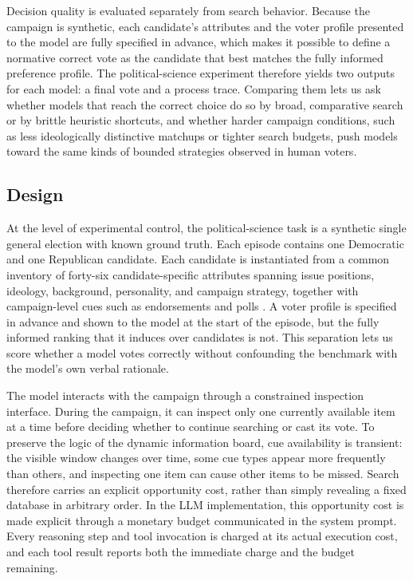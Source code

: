 Decision quality is evaluated separately from search behavior. Because the campaign is
synthetic, each candidate's attributes and the voter profile presented to the model are
fully specified in advance, which makes it possible to define a normative correct vote as
the candidate that best matches the fully informed preference profile. The
political-science experiment therefore yields two outputs for each model: a final vote and
a process trace. Comparing them lets us ask whether models that reach the correct choice
do so by broad, comparative search or by brittle heuristic shortcuts, and whether harder
campaign conditions, such as less ideologically distinctive matchups or tighter search
budgets, push models toward the same kinds of bounded strategies observed in human voters.

\subsection{Design}

At the level of experimental control, the political-science task is a synthetic
single general election with known ground truth. Each episode contains one Democratic and
one Republican candidate. Each candidate is instantiated from a common inventory of
forty-six candidate-specific attributes spanning issue positions, ideology, background,
personality, and campaign strategy, together with campaign-level cues such as
endorsements and polls \citep{lau2006voters}.
A voter profile is specified in advance and shown to the model at the start of the
episode, but the fully informed ranking that it induces over candidates is not. This
separation lets us score whether a model votes correctly without
confounding the benchmark with the model's own verbal rationale.

The model interacts with the campaign through a constrained inspection interface. During
the campaign, it can inspect only one currently available item at a time before deciding
whether to continue searching or cast its vote. To preserve the logic of the dynamic
information board, cue availability is transient: the visible window changes over time, some cue
types appear more frequently than others, and inspecting one item can cause other items
to be missed. Search therefore carries an explicit opportunity cost, rather than simply
revealing a fixed database in arbitrary order. In the LLM implementation, this
opportunity cost is made explicit through a monetary budget communicated in the
system prompt. Every reasoning step and tool invocation is charged at its
actual execution cost, and each tool result reports both the immediate charge
and the budget remaining.

